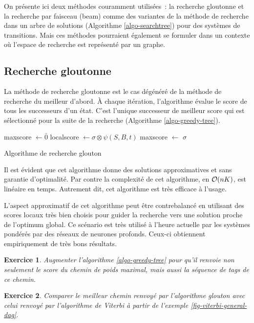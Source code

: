 \documentclass[11pt,openany]{book}
\newtheorem{exo}{Exercice}[chapter]
\begin{document}
On présente ici deux méthodes couramment utilisées~:  la recherche
gloutonne et la recherche par faisceau (beam) comme des variantes de
la méthode de recherche dans un arbre de solutions (Algorithme
\ref{algo-searchtree}) pour des systèmes de transitions. 
Mais ces méthodes pourraient également se formuler dans un contexte où l'espace de
recherche est représenté par un graphe.

\subsection{Recherche gloutonne}

La méthode de recherche gloutonne est le cas dégénéré de la méthode de
recherche du meilleur d'abord. \`A chaque itération, l'algorithme évalue
le score de tous les successeurs d'un état. C'est l'unique successeur
de meilleur score qui est sélectionné pour la suite de la recherche
(Algorithme \ref{algo-greedy-tree}).
\begin{algorithm}[htbp]
\begin{algorithmic}[1]
\State maxscore $\gets \bar{0}$
	\State localscore $\gets \sigma \otimes \psi(S,B,t)$
        \State maxscore $\gets$ 
\EndFor
\State\Return {}
\Else
  \State\Return $\sigma$
\EndIf
\EndFunction
\end{algorithmic}
\caption{\label{algo-greedy-tree}Algorithme de recherche glouton}
\end{algorithm}
Il est évident que cet algorithme donne des solutions approximatives
et sans garantie d'optimalité. Par contre la complexité de cet
algorithme, en ${\cal O}(n K)$,  est linéaire en temps. Autrement dit,
cet algorithme est très efficace à l'usage.

L'aspect approximatif de cet algorithme peut être contrebalancé
en utilisant des scores locaux  très bien choisis pour guider la recherche vers une solution proche de
l'optimum global. Ce
scénario est très utilisé à l'heure actuelle par les systèmes pondérés
par des réseaux de neurones profonds. Ceux-ci  obtiennent
empiriquement de très
bons résultats.

\begin{exo}
Augmenter l'algorithme \ref{algo-greedy-tree} pour qu'il renvoie
non seulement le score du chemin de poids maximal, mais aussi
la séquence de tags de ce chemin.
\end{exo}
\begin{exo}
Comparer le meilleur chemin renvoyé par l'algorithme glouton avec
celui 
renvoyé par l'algorithme de Viterbi à partir de l'exemple \ref{fig-viterbi-general-dag}.
\end{exo}
\end{document}
